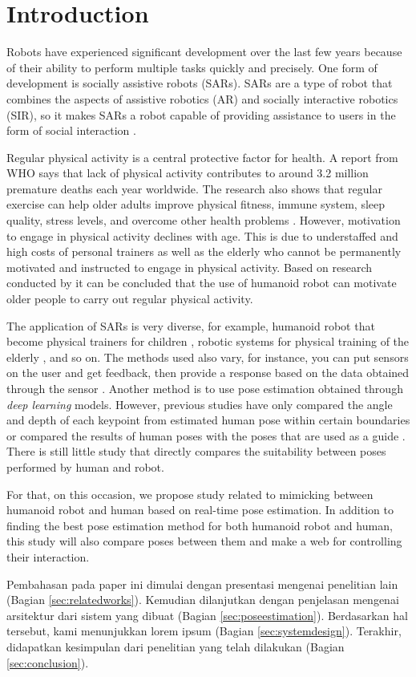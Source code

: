 \section{Introduction}
\label{sec:introduction}


Robots have experienced significant development over the last few years 
because of their ability to perform multiple tasks quickly and precisely.
One form of development is socially assistive robots (SARs). 
SARs are a type of robot that combines the aspects of assistive robotics (AR)
and socially interactive robotics (SIR), so it makes SARs a robot capable of providing assistance to users in the form of social interaction \citep{feil2005}.

Regular physical activity is a central protective factor for health.
A report from WHO says that lack of physical activity contributes to around 3.2 million premature deaths each year worldwide.
The research also shows that regular exercise can help older adults improve physical fitness, immune system, sleep quality, stress levels, and overcome other health problems \citep{lotfi2018}.
However, motivation to engage in physical activity declines with age. 
This is due to understaffed and high costs of personal trainers as well as the elderly who cannot be permanently motivated and instructed to engage in physical activity.
Based on research conducted by \citet{ruf2020} it can be concluded that the use of humanoid robot can motivate older people to carry out regular physical activity.

The application of SARs is very diverse, for example, humanoid robot that become physical trainers for children \citep{güneysu2017}, 
robotic systems for physical training of the elderly \citep{avioz2021}, and so on. The methods used also vary, for instance, 
you can put sensors on the user and get feedback, then provide a response based on the data obtained through the sensor \citep{güneysu2017}. 
Another method is to use pose estimation obtained through \emph{deep learning} models.
However, previous studies have only compared the angle and depth of each keypoint from estimated human pose within certain boundaries or compared the results of human poses with the poses that are used as a guide \citep{romeo}.
There is still little study that directly compares the suitability between poses performed by human and robot.

For that, on this occasion, we propose study related to mimicking between humanoid robot and human based on real-time pose estimation. 
In addition to finding the best pose estimation method for both humanoid robot and human, this study will also compare poses between them and make a web for controlling their interaction.

Pembahasan pada paper ini dimulai dengan presentasi mengenai penelitian lain (Bagian \ref{sec:relatedworks}).
Kemudian dilanjutkan dengan penjelasan mengenai arsitektur dari sistem yang dibuat (Bagian \ref{sec:poseestimation}).
Berdasarkan hal tersebut, kami menunjukkan lorem ipsum (Bagian \ref{sec:systemdesign}).
Terakhir, didapatkan kesimpulan dari penelitian yang telah dilakukan (Bagian \ref{sec:conclusion}).
